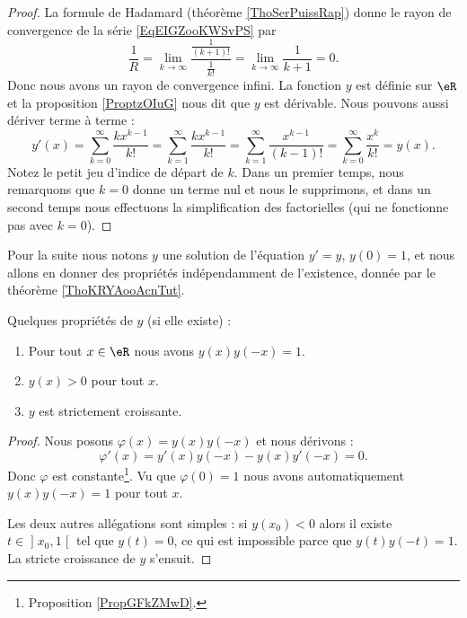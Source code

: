 \begin{proof}
    La formule de Hadamard (théorème \ref{ThoSerPuissRap}) donne le rayon de convergence de la série \eqref{EqEIGZooKWSvPS} par
    \begin{equation}
        \frac{1}{ R }=\lim_{k\to \infty} \frac{ \frac{1}{ (k+1)! } }{ \frac{1}{ k! } }=\lim_{k\to \infty} \frac{1}{ k+1 }=0.
    \end{equation}
    Donc nous avons un rayon de convergence infini. La fonction \( y\) est définie sur \( \eR\) et la proposition \ref{ProptzOIuG} nous dit que \( y\) est dérivable. Nous pouvons aussi dériver terme à terme :
    \begin{equation}
            y'(x)=\sum_{k=0}^{\infty}\frac{ kx^{k-1} }{ k! }=\sum_{k=1}^{\infty}\frac{ kx^{k-1} }{ k! }=\sum_{k=1}^{\infty}\frac{ x^{k-1} }{ (k-1)! }=\sum_{k=0}^{\infty}\frac{ x^k }{ k! }=y(x).
    \end{equation}
    Notez le petit jeu d'indice de départ de \( k\). Dans un premier temps, nous remarquons que \( k=0\) donne un terme nul et nous le supprimons, et dans un second temps nous effectuons la simplification des factorielles (qui ne fonctionne pas avec \( k=0\)).
\end{proof}

Pour la suite nous notons \( y\) une solution de l'équation \( y'=y\), \( y(0)=1\), et nous allons en donner des propriétés indépendamment de l'existence, donnée par le théorème \ref{ThoKRYAooAcnTut}.

\begin{proposition} \label{PropTLECooEiLbPP}
    Quelques propriétés de \( y\) (si elle existe) :
    \begin{enumerate}
        \item
            Pour tout \( x\in \eR\) nous avons \( y(x)y(-x)=1\).
        \item
            \( y(x)>0\) pour tout \( x\).
        \item
            \( y\) est strictement croissante.
    \end{enumerate}
\end{proposition}

\begin{proof}
    Nous posons \( \varphi(x)=y(x)y(-x)\) et nous dérivons :
    \begin{equation}
        \varphi'(x)=y'(x)y(-x)-y(x)y'(-x)=0.
    \end{equation}
    Donc \( \varphi\) est constante\footnote{Proposition \ref{PropGFkZMwD}.}. Vu que \( \varphi(0)=1\) nous avons automatiquement \( y(x)y(-x)=1\) pour tout \( x\).

Les deux autres allégations sont simples : si \( y(x_0)<0\) alors il existe \( t\in\mathopen] x_0 , 1 \mathclose[\) tel que \( y(t)=0\), ce qui est impossible parce que \( y(t)y(-t)=1\). La stricte croissance de \( y\) s'ensuit.
\end{proof}


